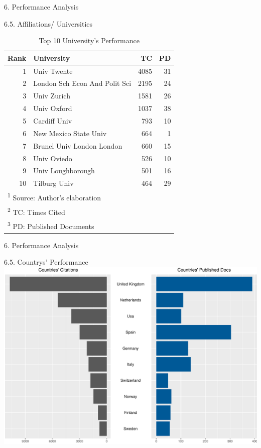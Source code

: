 \documentclass[
  ignorenonframetext,
]{beamer}
\begin{document}
\begin{frame}{6. Performance Analysis}
\protect\hypertarget{performance-analysis-5}{}
\begin{block}{6.5. Affiliations/ Universities}
\protect\hypertarget{affiliations-universities}{}
\begin{table}

\caption{\label{tab:Influencial UN}Top 10 University's Performance}
\centering
\fontsize{8}{10}\selectfont
\begin{tabular}[t]{r|l|r|r}
\hline
\textbf{Rank} & \textbf{University} & \textbf{TC} & \textbf{PD}\\
\hline
1 & Univ Twente & 4085 & 31\\
\hline
2 & London Sch Econ And Polit Sci & 2195 & 24\\
\hline
3 & Univ Zurich & 1581 & 26\\
\hline
4 & Univ Oxford & 1037 & 38\\
\hline
5 & Cardiff Univ & 793 & 10\\
\hline
6 & New Mexico State Univ & 664 & 1\\
\hline
7 & Brunel Univ London London & 660 & 15\\
\hline
8 & Univ Oviedo & 526 & 10\\
\hline
9 & Univ Loughborough & 501 & 16\\
\hline
10 & Tilburg Univ & 464 & 29\\
\hline
\multicolumn{4}{l}{\textsuperscript{1} Source: Author's elaboration}\\
\multicolumn{4}{l}{\textsuperscript{2} TC: Times Cited}\\
\multicolumn{4}{l}{\textsuperscript{3} PD: Published Documents}\\
\end{tabular}
\end{table}
\end{block}
\end{frame}

\begin{frame}{6. Performance Analysis}
\protect\hypertarget{performance-analysis-6}{}
\begin{block}{6.5. Countrys' Performance}
\protect\hypertarget{countrys-performance}{}
\includegraphics{Presentation_bibliometric_files/figure-beamer/Influencial CO-1.pdf}
\end{block}
\end{frame}
\end{document}
